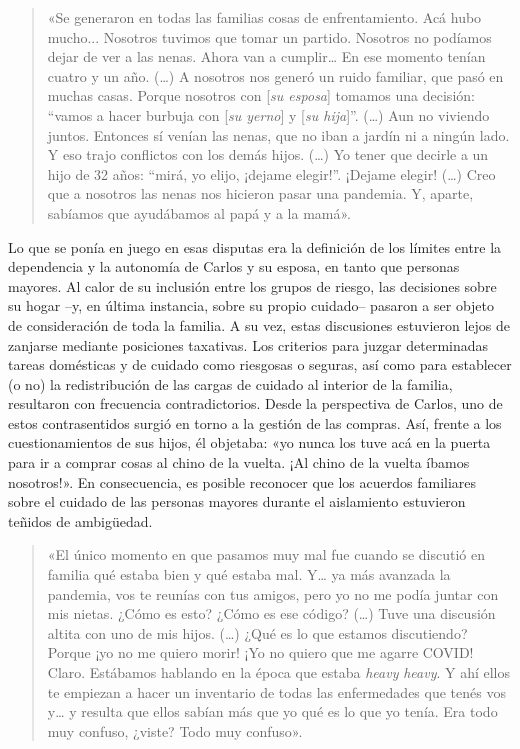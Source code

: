 \begin{quote}
«Se generaron en todas las familias cosas de enfrentamiento. Acá hubo mucho... Nosotros tuvimos que tomar un partido. Nosotros no podíamos dejar de ver a las nenas. Ahora van a cumplir\ldots{} En ese momento tenían cuatro y un año. (\ldots) A nosotros nos generó un ruido familiar, que pasó en muchas casas. Porque nosotros con {[}\emph{su esposa}{]} tomamos una decisión: ``vamos a hacer burbuja con {[}\emph{su yerno}{]} y {[}\emph{su hija}{]}''. (\ldots) Aun no viviendo juntos. Entonces sí venían las nenas, que no iban a jardín ni a ningún lado. Y eso trajo conflictos con los demás hijos. (\ldots) Yo tener que decirle a un hijo de 32 años: ``mirá, yo elijo, ¡dejame elegir!''. ¡Dejame elegir! (\ldots) Creo que a nosotros las nenas nos hicieron pasar una pandemia. Y, aparte, sabíamos que ayudábamos al papá y a la mamá».
\end{quote}

Lo que se ponía en juego en esas disputas era la definición de los límites entre la dependencia y la autonomía de Carlos y su esposa, en tanto que personas mayores. Al calor de su inclusión entre los grupos de riesgo, las decisiones sobre su hogar --y, en última instancia, sobre su propio cuidado-- pasaron a ser objeto de consideración de toda la familia. A su vez, estas discusiones estuvieron lejos de zanjarse mediante posiciones taxativas. Los criterios para juzgar determinadas tareas domésticas y de cuidado como riesgosas o seguras, así como para establecer (o no) la redistribución de las cargas de cuidado al interior de la familia, resultaron con frecuencia contradictorios. Desde la perspectiva de Carlos, uno de estos contrasentidos surgió en torno a la gestión de las compras. Así, frente a los cuestionamientos de sus hijos, él objetaba: «yo nunca los tuve acá en la puerta para ir a comprar cosas al chino de la vuelta. ¡Al chino de la vuelta íbamos nosotros!». En consecuencia, es posible reconocer que los acuerdos familiares sobre el cuidado de las personas mayores durante el aislamiento estuvieron teñidos de ambigüedad.

\begin{quote}
«El único momento en que pasamos muy mal fue cuando se discutió en familia qué estaba bien y qué estaba mal. Y\ldots{} ya más avanzada la pandemia, vos te reunías con tus amigos, pero yo no me podía juntar con mis nietas. ¿Cómo es esto? ¿Cómo es ese código? (\ldots) Tuve una discusión altita con uno de mis hijos. (\ldots) ¿Qué es lo que estamos discutiendo? Porque ¡yo no me quiero morir! ¡Yo no quiero que me agarre COVID! Claro. Estábamos hablando en la época que estaba \emph{heavy} \emph{heavy}. Y ahí ellos te empiezan a hacer un inventario de todas las enfermedades que tenés vos y\ldots{} y resulta que ellos sabían más que yo qué es lo que yo tenía. Era todo muy confuso, ¿viste? Todo muy confuso».
\end{quote}

